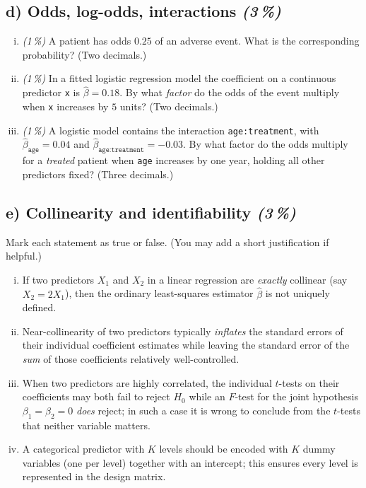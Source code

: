\documentclass[11pt,a4paper]{article}
\newcommand{\subpoints}[1]{\textit{(#1\,\%)}}
\begin{document}
\subsection*{d) Odds, log-odds, interactions \subpoints{3}}
\begin{enumerate}[(i)]
  \item \subpoints{1} A patient has odds $0.25$ of an adverse event. What is the corresponding probability? (Two decimals.)
  \item \subpoints{1} In a fitted logistic regression model the coefficient on a continuous predictor \texttt{x} is $\hat\beta=0.18$. By what \emph{factor} do the odds of the event multiply when \texttt{x} increases by $5$ units? (Two decimals.)
  \item \subpoints{1} A logistic model contains the interaction \texttt{age:treatment}, with $\hat\beta_{\texttt{age}}=0.04$ and $\hat\beta_{\texttt{age:treatment}}=-0.03$. By what factor do the odds multiply for a \emph{treated} patient when \texttt{age} increases by one year, holding all other predictors fixed? (Three decimals.)
\end{enumerate}

\subsection*{e) Collinearity and identifiability \subpoints{3}}
Mark each statement as true or false. (You may add a short justification if helpful.)
\begin{enumerate}[(i)]
  \item If two predictors $X_1$ and $X_2$ in a linear regression are \emph{exactly} collinear (say $X_2 = 2X_1$), then the ordinary least-squares estimator $\hat\beta$ is not uniquely defined.
  \item Near-collinearity of two predictors typically \emph{inflates} the standard errors of their individual coefficient estimates while leaving the standard error of the \emph{sum} of those coefficients relatively well-controlled.
  \item When two predictors are highly correlated, the individual $t$-tests on their coefficients may both fail to reject $H_0$ while an $F$-test for the joint hypothesis $\beta_1=\beta_2=0$ \emph{does} reject; in such a case it is wrong to conclude from the $t$-tests that neither variable matters.
  \item A categorical predictor with $K$ levels should be encoded with $K$ dummy variables (one per level) together with an intercept; this ensures every level is represented in the design matrix.
\end{enumerate}
\end{document}
